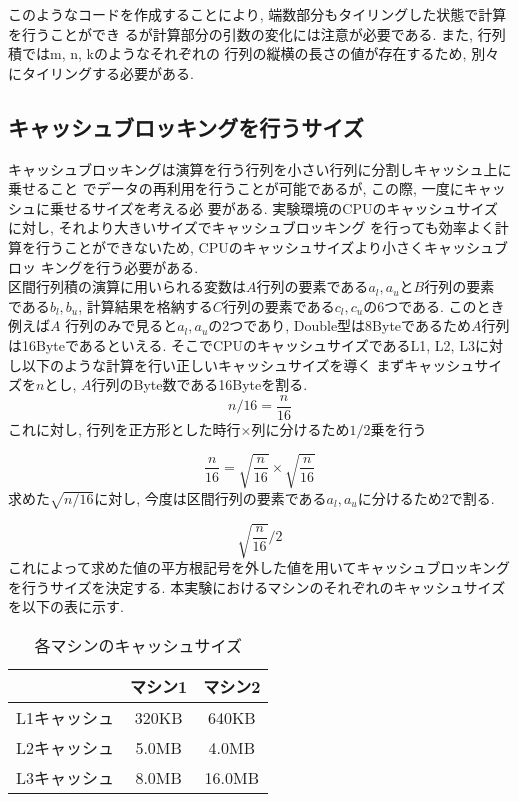 \documentclass[11pt,a4paper]{jsreport}
\theoremstyle{definition}
\begin{document}
このようなコードを作成することにより, 端数部分もタイリングした状態で計算を行うことができ
るが計算部分の引数の変化には注意が必要である. また, 行列積ではm, n, kのようなそれぞれの
行列の縦横の長さの値が存在するため, 別々にタイリングする必要がある.
\subsection{キャッシュブロッキングを行うサイズ}
	キャッシュブロッキングは演算を行う行列を小さい行列に分割しキャッシュ上に乗せること
でデータの再利用を行うことが可能であるが, この際, 一度にキャッシュに乗せるサイズを考える必
要がある. 実験環境のCPUのキャッシュサイズに対し, それより大きいサイズでキャッシュブロッキング
を行っても効率よく計算を行うことができないため, CPUのキャッシュサイズより小さくキャッシュブロッ
キングを行う必要がある. \\
\indent	区間行列積の演算に用いられる変数は$A$行列の要素である$a_l,a_u$と$B$行列の要素
である$b_l,b_u$, 計算結果を格納する$C$行列の要素である$c_l,c_u$の6つである. このとき例えば$A$
行列のみで見ると$a_l,a_u$の2つであり, Double型は8Byteであるため$A$行列は16Byteであるといえる. 
そこでCPUのキャッシュサイズであるL1, L2, L3に対し以下のような計算を行い正しいキャッシュサイズを導く
まずキャッシュサイズを$n$とし, $A$行列のByte数である16Byteを割る.
 \begin{equation}
 n / 16 = \frac{n}{16}
 \end{equation}
これに対し, 行列を正方形とした時行$\times$列に分けるため$1/2$乗を行う

\begin{equation}
\frac{n}{16} = \sqrt{\frac{n}{16}} \times \sqrt{\frac{n}{16}}
\end{equation}
求めた$\sqrt{n/16}$に対し, 今度は区間行列の要素である$a_l,a_u$に分けるため2で割る.

\begin{equation}
\sqrt{\frac{n}{16}} /2 
\end{equation}
これによって求めた値の平方根記号を外した値を用いてキャッシュブロッキングを行うサイズを決定する. 
\indent	本実験におけるマシンのそれぞれのキャッシュサイズを以下の表に示す.

\begin{table}[h]
\centering
\caption{各マシンのキャッシュサイズ}
\begin{tabular}{|c|c|c|}
\hline
& マシン1 & マシン2 \\ \hline
L1キャッシュ & 320KB & 640KB \\ \hline
L2キャッシュ & 5.0MB & 4.0MB \\ \hline
L3キャッシュ & 8.0MB & 16.0MB \\ \hline
\end{tabular}
\end{table}
\end{document}
